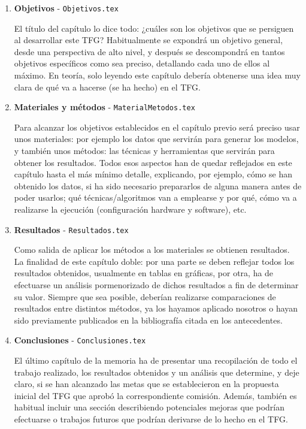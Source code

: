 \begin{enumerate}
    \item \textbf{Objetivos} - \texttt{Objetivos.tex} \par
    El título del capítulo lo dice todo: ¿cuáles son los objetivos que se persiguen al desarrollar este TFG? Habitualmente se expondrá un objetivo general, desde una perspectiva de alto nivel, y después se descompondrá en tantos objetivos específicos como sea preciso, detallando cada uno de ellos al máximo. En teoría, solo leyendo este capítulo debería obtenerse una idea muy clara de qué va a hacerse (se ha hecho) en el TFG.
    
    \item \textbf{Materiales y métodos} - \texttt{MaterialMetodos.tex} \par
    Para alcanzar los objetivos establecidos en el capítulo previo será preciso usar unos materiales: por ejemplo los datos que servirán para generar los modelos, y también unos métodos: las técnicas y herramientas que servirán para obtener los resultados. Todos esos aspectos han de quedar reflejados en este capítulo hasta el más mínimo detalle, explicando, por ejemplo, cómo se han obtenido los datos, si ha sido necesario prepararlos de alguna manera antes de poder usarlos; qué técnicas/algoritmos van a emplearse y por qué, cómo va a realizarse la ejecución (configuración hardware y software), etc.
    
    \item \textbf{Resultados} - \texttt{Resultados.tex} \par
    Como salida de aplicar los métodos a los materiales se obtienen resultados. La finalidad de este capítulo doble: por una parte se deben reflejar todos los resultados obtenidos, usualmente en tablas en gráficas, por otra, ha de efectuarse un análisis pormenorizado de dichos resultados a fin de determinar su valor. Siempre que sea posible, deberían realizarse comparaciones de resultados entre distintos métodos, ya los hayamos aplicado nosotros o hayan sido previamente publicados en la bibliografía citada en los antecedentes.
    
    \item \textbf{Conclusiones} - \texttt{Conclusiones.tex} \par
    El último capítulo de la memoria ha de presentar una recopilación de todo el trabajo realizado, los resultados obtenidos y un análisis que determine, y deje claro, si se han alcanzado las metas que se establecieron en la propuesta inicial del TFG que aprobó la correspondiente comisión. Además, también es habitual incluir una sección describiendo potenciales mejoras que podrían efectuarse o trabajos futuros que podrían derivarse de lo hecho en el TFG.
\end{enumerate}

